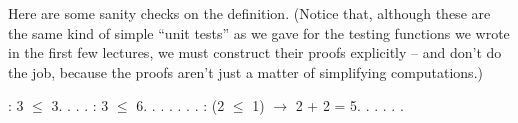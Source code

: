 \documentclass[12pt]{report}
\begin{document}
 Here are some sanity checks on the definition.  (Notice that,
    although these are the same kind of simple ``unit tests'' as we gave
    for the testing functions we wrote in the first few lectures, we
    must construct their proofs explicitly --  and
     don't do the job, because the proofs aren't just a
    matter of simplifying computations.) \begin{coqdoccode}
\coqdocemptyline
\coqdocnoindent
{}  :\coqdoceol
\coqdocindent{1.00em}
3 \ensuremath{\le} 3.\coqdoceol
\coqdocnoindent
{}.\coqdoceol
\coqdocindent{1.00em}
 . .\coqdoceol
\coqdocemptyline
\coqdocnoindent
{}  :\coqdoceol
\coqdocindent{1.00em}
3 \ensuremath{\le} 6.\coqdoceol
\coqdocnoindent
{}.\coqdoceol
\coqdocindent{1.00em}
 .  .  .  . .\coqdoceol
\coqdocemptyline
\coqdocnoindent
{}  :\coqdoceol
\coqdocindent{1.00em}
(2 \ensuremath{\le} 1) \ensuremath{\rightarrow} 2 + 2 = 5.\coqdoceol
\coqdocnoindent
{}.\coqdoceol
\coqdocindent{1.00em}
 .  .  . .\coqdoceol
\coqdocemptyline
\end{coqdoccode}
\subsubsection{ }
\end{document}
